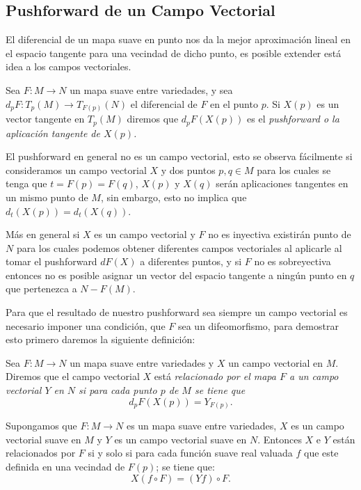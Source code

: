 \subsection{Pushforward de un Campo Vectorial}\label{Subsección: Pushforward de Campos Vectoriales}

El diferencial de un mapa suave en punto nos da la mejor aproximación lineal en el espacio tangente para una vecindad de dicho punto, es posible extender está idea a los campos vectoriales.

\begin{definition}[Pushforward]
	Sea $F: M \to N$ un mapa suave entre variedades, y sea $d_pF: T_p(M) \to T_{F(p)}(N)$ el diferencial de $F$ en el punto $p$. Si $X(p)$ es un vector tangente en $T_p(M)$ diremos que $d_{p}F(X(p))$ es el \it{pushforward} o la \it{aplicación tangente} de $X(p)$.
\end{definition}

El pushforward en general no es un campo vectorial, esto se observa fácilmente si consideramos un campo vectorial $X$ y dos puntos $p,q \in M$ para los cuales se tenga que $t = F(p) = F(q)$, $X(p)$ y $X(q)$ serán aplicaciones tangentes en un mismo punto de $M$, sin embargo, esto no implica que $d_t(X(p)) = d_t(X(q))$.

Más en general si $X$ es un campo vectorial y $F$ no es inyectiva existirán punto de $N$ para los cuales podemos obtener diferentes campos vectoriales al aplicarle al tomar el pushforward $dF(X)$ a diferentes puntos, y si $F$ no es sobreyectiva entonces no es posible asignar un vector del espacio tangente a ningún punto en $q$ que pertenezca a $N - F(M)$.

Para que el resultado de nuestro pushforward sea siempre un campo vectorial es necesario imponer una condición, que $F$ sea un difeomorfismo, para demostrar esto primero daremos la siguiente definición:

\begin{definition}
	Sea $F: M \to N$ un mapa suave entre variedades y $X$ un campo vectorial en $M$. Diremos que el campo vectorial $X$ está \it{relacionado por el mapa $F$} a un campo vectorial $Y$ en $N$ si para cada punto $p$ de $M$ se tiene que
	\[
		d_pF(X(p)) = Y_{F(p)}.
	\]
\end{definition}

\begin{lemma}
	Supongamos que $F: M \to N$ es un mapa suave entre variedades, $X$ es un campo vectorial suave en $M$ y $Y$ es un campo vectorial suave en $N$. Entonces $X$ e $Y$ están relacionados por $F$ si y solo si para cada función suave real valuada $f$ que este definida en una vecindad de $F(p)$; se tiene que:
	\[
		X(f \circ F) = (Yf) \circ F.
	\]
\end{lemma}

